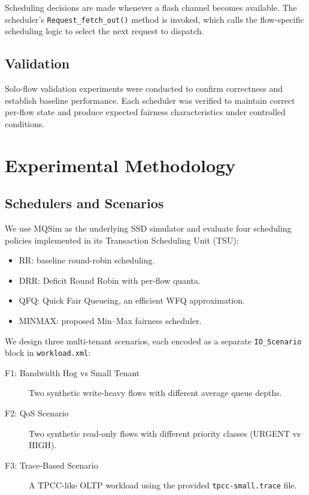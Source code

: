 \documentclass[11pt]{article}
\begin{document}
Scheduling decisions are made whenever a flash channel becomes available. The scheduler's \texttt{Request\_fetch\_out()} method is invoked, which calls the flow-specific scheduling logic to select the next request to dispatch.

\subsection{Validation}

Solo-flow validation experiments were conducted to confirm correctness and establish baseline performance. Each scheduler was verified to maintain correct per-flow state and produce expected fairness characteristics under controlled conditions.

\section{Experimental Methodology}

\subsection{Schedulers and Scenarios}

We use MQSim as the underlying SSD simulator and evaluate four scheduling policies implemented in its Transaction Scheduling Unit (TSU):
\begin{itemize}
    \item RR: baseline round-robin scheduling.
    \item DRR: Deficit Round Robin with per-flow quanta.
    \item QFQ: Quick Fair Queueing, an efficient WFQ approximation.
    \item MINMAX: proposed Min--Max fairness scheduler.
\end{itemize}

We design three multi-tenant scenarios, each encoded as a separate \texttt{IO\_Scenario} block in \texttt{workload.xml}:

\begin{description}
    \item[F1: Bandwidth Hog vs Small Tenant] Two synthetic write-heavy flows with different average queue depths.
    \item[F2: QoS Scenario] Two synthetic read-only flows with different priority classes (URGENT vs HIGH).
    \item[F3: Trace-Based Scenario] A TPCC-like OLTP workload using the provided \texttt{tpcc-small.trace} file.
\end{description}
\end{document}
